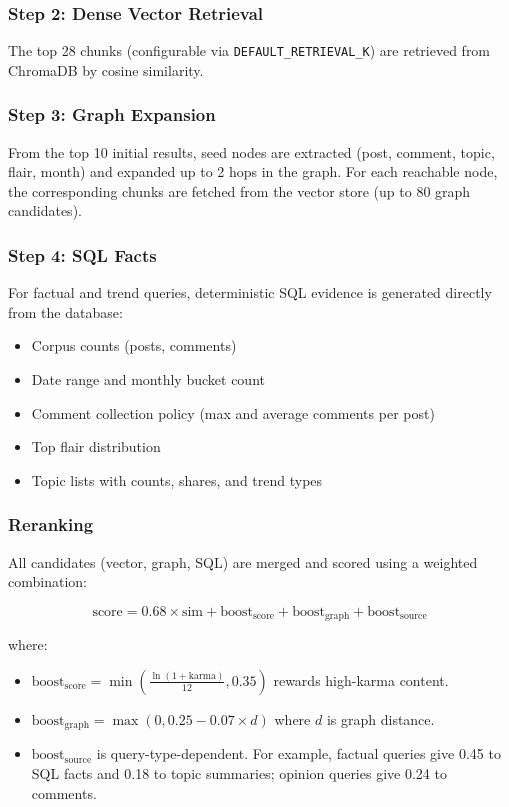 \documentclass[11pt,a4paper]{article}
\begin{document}
\subsubsection{Step 2: Dense Vector Retrieval}

The top 28 chunks (configurable via \texttt{DEFAULT\_RETRIEVAL\_K}) are retrieved from ChromaDB by cosine similarity.

\subsubsection{Step 3: Graph Expansion}

From the top 10 initial results, seed nodes are extracted (post, comment, topic, flair, month) and expanded up to 2 hops in the graph. For each reachable node, the corresponding chunks are fetched from the vector store (up to 80 graph candidates).

\subsubsection{Step 4: SQL Facts}

For factual and trend queries, deterministic SQL evidence is generated directly from the database:
\begin{itemize}[leftmargin=*]
  \item Corpus counts (posts, comments)
  \item Date range and monthly bucket count
  \item Comment collection policy (max and average comments per post)
  \item Top flair distribution
  \item Topic lists with counts, shares, and trend types
\end{itemize}

\subsubsection{Reranking}

All candidates (vector, graph, SQL) are merged and scored using a weighted combination:

\[
  \text{score} = 0.68 \times \text{sim} + \text{boost}_\text{score} + \text{boost}_\text{graph} + \text{boost}_\text{source}
\]

where:
\begin{itemize}[leftmargin=*]
  \item $\text{boost}_\text{score} = \min\left(\frac{\ln(1 + \text{karma})}{12}, 0.35\right)$ rewards high-karma content.
  \item $\text{boost}_\text{graph} = \max(0, 0.25 - 0.07 \times d)$ where $d$ is graph distance.
  \item $\text{boost}_\text{source}$ is query-type-dependent. For example, factual queries give 0.45 to SQL facts and 0.18 to topic summaries; opinion queries give 0.24 to comments.
\end{itemize}
\end{document}
